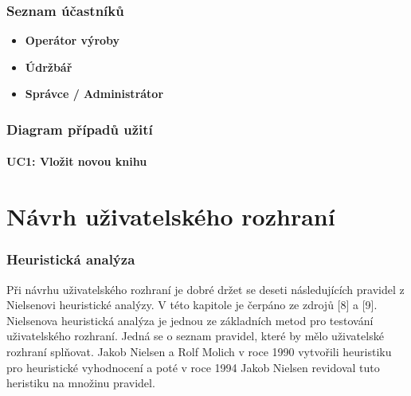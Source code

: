 \documentclass[thesis=M,czech]{FITthesis}[2012/06/26]
\begin{document}
\subsection{Seznam účastníků}

\begin{itemize}
	\item
	\textbf{Operátor výroby} 
	\item
	\textbf{Údržbář} 
	\item
	\textbf{Správce / Administrátor}
\end{itemize} 	

\subsection{Diagram případů užití}

\subsubsection{UC1: Vložit novou knihu}

\chapter{Návrh uživatelského rozhraní}

\subsection{}

\subsection{Heuristická analýza}
Při návrhu uživatelského rozhraní je dobré držet se deseti následujících pravidel z Nielsenovi heuristické analýzy. V této kapitole je čerpáno ze zdrojů [8] a [9]. Nielsenova heuristická analýza je jednou ze základních metod pro testování uživatelského rozhraní. Jedná se o seznam pravidel, které by mělo uživatelské rozhraní splňovat. Jakob Nielsen a Rolf Molich v roce 1990 vytvořili heuristiku
pro heuristické vyhodnocení a poté v roce 1994 Jakob Nielsen revidoval tuto heristiku na množinu pravidel.
\end{document}

